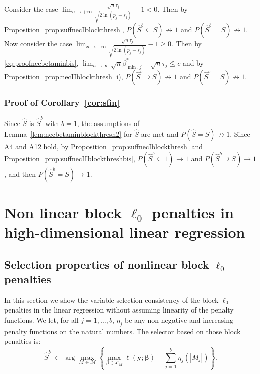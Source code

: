 \documentclass[aos]{imsart}
\theoremstyle{plain}
\newcommand{\M}{\mathcal{M}}
\newcommand{\bs}{\boldsymbol}
\begin{document}
Consider the case $\lim_{n\to +\infty}\tfrac{\sqrt{n}\tau_j}{\sqrt{2\ln(p_j-s_j)}}-1<0$. Then by Proposition~\ref{prop:suffnecIblockthresh},
$P(\hat{S}^{b} \subseteq S)\not \to 1$ and $P(\hat{S}^{b} = S)\not \to 1$. 
Now consider the case $\lim_{n\to +\infty}\tfrac{\sqrt{n}\tau_j}{\sqrt{2\ln(p_j-s_j)}}-1 \geq0$. Then by \eqref{eq:proofnecbetaminbis},  $\lim_{n\to \infty}\sqrt{n}\beta_{\min,j}^*-\sqrt{n}\tau_j \leq c$ and by Proposition~\ref{prop:necIIblockthresh} i), $P(\hat{S}^{b} \supseteq S)\not \to 1$ and $P(\hat{S}^{b} = S)\not \to 1$.

\subsubsection{Proof of Corollary~\ref{cor:sfin}}
Since $\hat{S}$ is $\hat{S}^b$ with $b=1$, the assumptions of Lemma~\ref{lem:necbetaminblockthresh2} for $\hat{S}$ are met and $P(\hat{S} = S)\not \to 1$. Since A4 and A12 hold, by Proposition~\ref{prop:suffnecIblockthresh} and Proposition~\ref{prop:suffnecIIblockthreshbis}, $P(\hat{S}^b \subseteq 1)\to 1$ and $P( \hat{S}^b \supseteq S)\to 1$, and then $P(\hat{S}^b = S)\to 1$.

\section{Non linear block $\ell_0$ penalties in high-dimensional linear regression}\label{sec:appendixnonlinear}

\subsection{Selection properties of nonlinear block $\ell_0$ penalties}

In this section we show the variable selection consistency of the block $\ell_0$ penalties in the linear regression without assuming linearity of the penalty functions. We let, for all $j=1,\ldots,b$, $\eta_j$ be any non-negative and increasing penalty functions on the natural numbers. The selector based on those block penalties is:
\begin{equation}
  \hat S^b\;\in\;\arg\max_{M\in \M} \left\{\max_{\beta\in \mathcal{L}_M} \ell(\bs y;\bs \beta)-\sum_{j=1}^b\eta_j (|M_j|)\right\}.
\end{equation}
\end{document}
